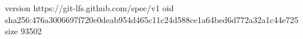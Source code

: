 version https://git-lfs.github.com/spec/v1
oid sha256:476a3006697f720e0deab954d465c11c24d588ce1a64bed6d772a32a1c44e725
size 93502
